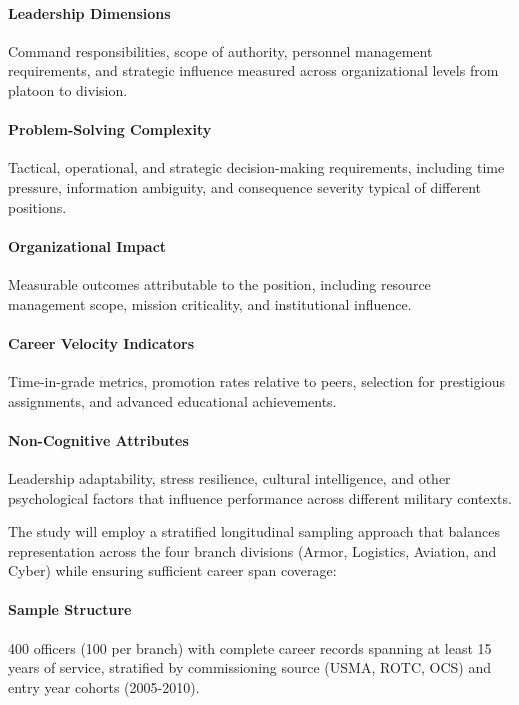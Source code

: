 \documentclass[../main.tex]{subfiles}
\begin{document}
\paragraph{Leadership Dimensions} Command responsibilities, scope of authority, personnel management requirements, and strategic influence measured across organizational levels from platoon to division.

\paragraph{Problem-Solving Complexity} Tactical, operational, and strategic decision-making requirements, including time pressure, information ambiguity, and consequence severity typical of different positions.

\paragraph{Organizational Impact} Measurable outcomes attributable to the position, including resource management scope, mission criticality, and institutional influence.

\paragraph{Career Velocity Indicators} Time-in-grade metrics, promotion rates relative to peers, selection for prestigious assignments, and advanced educational achievements.

\paragraph{Non-Cognitive Attributes} Leadership adaptability, stress resilience, cultural intelligence, and other psychological factors that influence performance across different military contexts.

The study will employ a stratified longitudinal sampling approach that balances representation across the four branch divisions (Armor, Logistics, Aviation, and Cyber) while ensuring sufficient career span coverage:

\paragraph{Sample Structure} 400 officers (100 per branch) with complete career records spanning at least 15 years of service, stratified by commissioning source (USMA, ROTC, OCS) and entry year cohorts (2005-2010).
\end{document}
